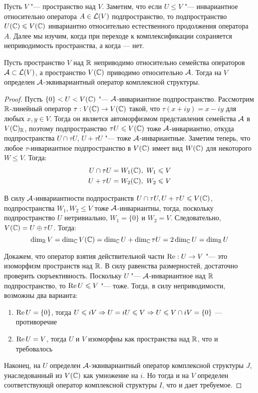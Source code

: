 \begin{note}
	Пусть $V$ "--- пространство над $V$. Заметим, что если $U \le V$ "--- инвариантное относительно оператора $A \in \mathcal L(V)$ подпространство, то подпространство $U(\mathbb{C}) \leqslant V(\mathbb{C})$ инвариантно относительно естественного продолжения оператора $A$. Далее мы изучим, когда при переходе к комплексификации сохраняется неприводимость пространства, а когда --- нет.
\end{note}

\begin{theorem}
	Пусть пространство $V$ над $\mathbb{R}$ неприводимо относительно семейства операторов $\mathcal A \subset \mathcal L(V)$, а пространство $V(\mathbb{C})$ приводимо относительно $\mathcal A$. Тогда на $V$ определен $\mathcal A$-эквивариантный оператор комплексной структуры.
\end{theorem}

\begin{proof}
	Пусть $\{0\} < U < V(\mathbb{C})$ "--- $\mathcal A$-инвариантное подпространство. Рассмотрим $\mathbb{R}$-линейный оператор $\tau : V(\mathbb{C}) \to V(\mathbb{C})$ такой, что $\tau (x + iy) = x - iy$ для любых $x, y \in V$. Тогда он является автоморфизмом представления семейства $\mathcal A$ в $V(\mathbb{C})_{\mathbb{R}}$, поэтому подпространство $\tau U \leqslant V(\mathbb{C})$ тоже $\mathcal A$-инвариантно, откуда подпространства $U \cap \tau U$, $U + \tau U$ "--- тоже $\mathcal A$-инвариантные. Заметим теперь, что любое $\tau$-инвариантное подпространство в $V(\mathbb{C})$ имеет вид $W(\mathbb{C})$ для некоторого $W \le V$. Тогда:
	\begin{align*}
		U \cap \tau U &= W_1(\mathbb{C}),~W_1 \leqslant V\\
		U + \tau U &= W_2(\mathbb{C}),~W_2 \leqslant V
	\end{align*}
	
	В силу $\mathcal A$-инвариантности подпространств $U \cap \tau U, U + \tau U \leqslant V(\mathbb{C})$, подпространства $W_1, W_2 \le V$ тоже $\mathcal A$-инвариантны, тогда, поскольку подпространство $U$ нетривиально, $W_1 = \{0\}$ и $W_2 = V$. Следовательно, $V(\mathbb{C}) = U \oplus \tau U$. Тогда:
	\[\dim_{\mathbb{R}} V = \dim_{\mathbb{C}} V(\mathbb{C}) = \dim_{\mathbb{C}} U + \dim_{\mathbb{C}} \tau U = 2\dim_{\mathbb{C}} U = \dim_{\mathbb{R}} U\]
	
	Докажем, что оператор взятия действительной части $\operatorname{Re} : U \to V$ "--- это изоморфизм пространств над $\mathbb{R}$. В силу равенства размерностей, достаточно проверить сюръективность. Поскольку $U$ "--- $\mathcal A$-инвариантное над $\mathbb{R}$ подпространство, то $\operatorname{Re} U \leqslant V$ "--- тоже. Тогда, в силу неприводимости, возможны два варианта:
	\begin{enumerate}
		\item $\operatorname{Re} U= \{0\}$, тогда $U \leqslant iV \Rightarrow U = iU \leqslant V \Rightarrow U \leqslant V \cap iV = \{0\}$ --- противоречие
		\item $\operatorname{Re} U = V$, тогда $U$ и $V$ изоморфны как пространства над $\mathbb{R}$, что и требовалось
	\end{enumerate} 
		
	Наконец, на $U$ определен $\mathcal A$-эквивариантный оператор комплексной структуры $J$, унаследованный из $V(\mathbb{C})$ как умножение на $i$. Но тогда и на $V$ определен соответствующй оператор комплексной структуры $I$, что и дает требуемое.
\end{proof}

